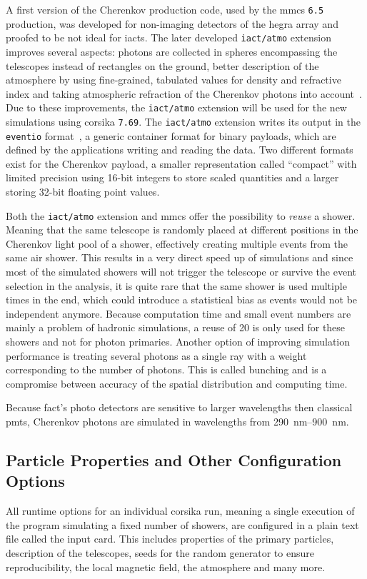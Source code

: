 A first version of the Cherenkov production code, used by the \gls{mmcs} \texttt{6.5}
production, was developed for non-imaging detectors of the \gls{hegra} array and proofed
to be not ideal for \glspl{iact}.
The later developed \texttt{iact/atmo} extension improves several aspects:
photons are collected in spheres encompassing the telescopes instead of
rectangles on the ground,
better description of the atmosphere by using fine-grained, tabulated values
for density and refractive index and taking atmospheric refraction of the Cherenkov
photons into account~\cite{iactatmo}.
Due to these improvements, the \texttt{iact/atmo} extension will be used for the
new simulations using \gls{corsika} \texttt{7.69}.
The \texttt{iact/atmo} extension writes its output in the \texttt{eventio} format~\cite{eventio},
a generic container format for binary payloads,
which are defined by the applications writing and reading the data.
Two different formats exist for the Cherenkov payload,
a smaller representation called \enquote{compact} 
with limited precision using 16-bit integers to store scaled quantities and a larger
storing 32-bit floating point values.

Both the \texttt{iact/atmo} extension and \gls{mmcs} offer the possibility
to \emph{reuse} a shower.
Meaning that the same telescope is randomly placed at different 
positions in the Cherenkov light pool of a shower,
effectively creating multiple events from the same air shower.
This results in a very direct speed up of simulations and since
most of the simulated showers will not trigger the telescope or survive
the event selection in the analysis, it is quite rare that the same shower 
is used multiple times in the end, which could introduce a statistical
bias as events would not be independent anymore.
Because computation time and small event numbers are mainly a problem of 
hadronic simulations, a reuse of 20 is only used for these showers and not for photon primaries.
Another option of improving simulation performance is treating several photons
as a single ray with a weight corresponding to the number of photons.
This is called bunching and is a compromise between accuracy of the spatial 
distribution and computing time.

Because \gls{fact}'s photo detectors are sensitive to larger wavelengths then
classical \glspl{pmt}, Cherenkov photons are simulated in wavelengths from \SIrange{290}{900}{\nano\meter}.  

\subsection{Particle Properties and Other Configuration Options}
All runtime options for an individual corsika run, meaning a single execution of
the program simulating a fixed number of showers, are configured in a 
plain text file called the input card.
This includes properties of the primary particles, 
description of the telescopes, seeds for the random generator to ensure
reproducibility, the local magnetic field, the atmosphere and many more.

